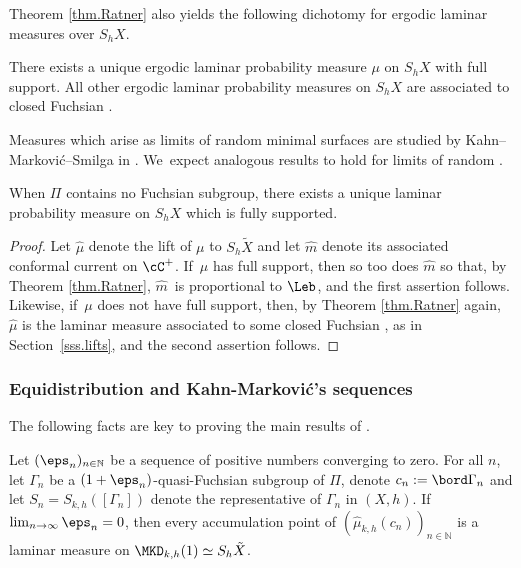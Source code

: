 Theorem \ref{thm.Ratner} also yields the following dichotomy for ergodic laminar measures over $S_hX$.

\begin{theorem}\label{thm.dichotomy_laminar} There exists a unique ergodic laminar probability measure $\mu$ on $S_hX$ with full support. All other ergodic laminar probability measures on $S_hX$ are associated to closed Fuchsian \ksurfaces.
\end{theorem}

\begin{remark}
Measures which arise as limits of random minimal surfaces are studied by Kahn--Markovi\'c--Smilga in \cite{KMS}. We~expect analogous results to hold for limits of random \ksurfaces.
\end{remark}

\begin{remark}
When $\Pi$ contains no Fuchsian subgroup, there exists a unique laminar probability measure on $S_hX$ which is fully supported.
\end{remark}

\begin{proof}
Let $\hat\mu$ denote the lift of $\mu$ to $S_h\tilde{X}$ and let $\hat m$ denote its associated conformal current on $\cC^+$. If~$\mu$ has full support, then so too does $\hat m$ so that, by Theorem \ref{thm.Ratner}, $\hat m$~is proportional to $\Leb$, and the first assertion follows. Likewise, if~$\mu$ does not have full support, then, by Theorem \ref{thm.Ratner} again, $\hat\mu$ is the laminar measure associated to some closed Fuchsian \ksurface, as in Section~\ref{sss.lifts}, and the second assertion follows.
\end{proof}

\subsubsection{Equidistribution and Kahn-Markovi\'c's sequences} The following facts are key to proving the main results of \cite{ALS}.

\begin{lemma}\label{lem.conv_fuchsian}
Let $(\eps_n)_{n\in\mathbb{N}}$ be a sequence of positive numbers converging to zero. For all $n$, let $\Gamma_n$ be a $(1+\eps_n)$-quasi-Fuchsian subgroup of $\Pi$, denote $c_n:=\bord\Gamma_n$ and let $S_n=S_{k,h}([\Gamma_n])$ denote the \ksurface representative of $\Gamma_n$ in $(X,h)$. If~$\lim_{n\to\infty}\eps_n=0$, then every accumulation point of $(\hat\mu_{k,h}(c_n))_{n\in\mathbb{N}}$ is a laminar measure on $\MKD_{k,h}(1)\simeq S_{h}\tilde{X}$.
\end{lemma}

